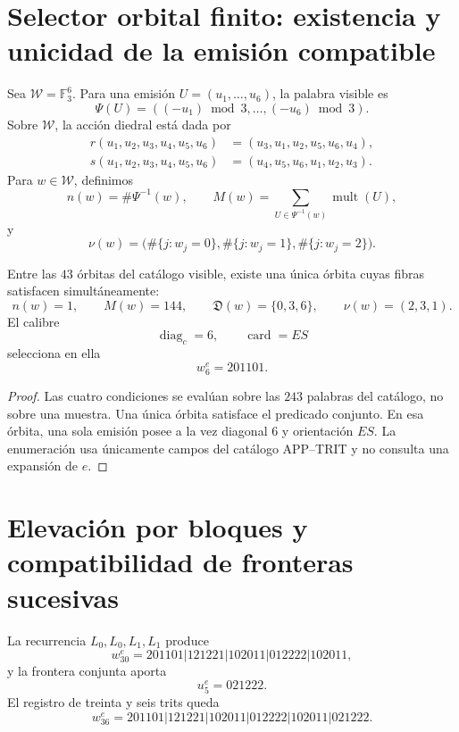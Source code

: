 
\label{gfp:b:chap:biografia-completa-e}

\section{Selector orbital finito: existencia y unicidad de la emisión compatible}

Sea \(\mathcal W=\mathbb F_3^6\). Para una emisión
\(U=(u_1,\ldots,u_6)\), la palabra visible es
\[
 \Psi(U)=((-u_1)\bmod3,\ldots,(-u_6)\bmod3).
\]
Sobre \(\mathcal W\), la acción diedral está dada por
\[
\begin{aligned}
 r(u_1,u_2,u_3,u_4,u_5,u_6)
 &=(u_3,u_1,u_2,u_5,u_6,u_4),\\
 s(u_1,u_2,u_3,u_4,u_5,u_6)
 &=(u_4,u_5,u_6,u_1,u_2,u_3).
\end{aligned}
\]
Para \(w\in\mathcal W\), definimos
\[
 n(w)=\#\Psi^{-1}(w),
 \qquad
 M(w)=\sum_{U\in\Psi^{-1}(w)}\operatorname{mult}(U),
\]
y
\[
 \nu(w)=
 \bigl(
 \#\{j:w_j=0\},
 \#\{j:w_j=1\},
 \#\{j:w_j=2\}
 \bigr).
\]

\begin{theorem}
\label{gfp:b:thm:seleccion-estructural-e}
Entre las \(43\) órbitas del catálogo visible, existe una única órbita cuyas
fibras satisfacen simultáneamente:
\[
 n(w)=1,\qquad M(w)=144,\qquad
 \mathfrak D(w)=\{0,3,6\},\qquad
 \nu(w)=(2,3,1).
\]
El calibre
\[
 \operatorname{diag}_c=6,
 \qquad \operatorname{card}=ES
\]
selecciona en ella
\[
 \boxed{w_6^e=201101.}
\]
\end{theorem}

\begin{proof}
Las cuatro condiciones se evalúan sobre las \(243\) palabras del catálogo,
no sobre una muestra. Una única órbita satisface el predicado conjunto. En
esa órbita, una sola emisión posee a la vez diagonal \(6\) y orientación
\(ES\). La enumeración usa únicamente campos del catálogo APP--TRIT y no
consulta una expansión de \(e\).
\end{proof}

\section{Elevación por bloques y compatibilidad de fronteras sucesivas}

La recurrencia \(L_0,L_0,L_1,L_1\) produce
\[
 w_{30}^{e}
 =201101|121221|102011|012222|102011,
\]
y la frontera conjunta aporta
\[
 u_5^e=021222.
\]
El registro de treinta y seis trits queda
\[
 w_{36}^{e}
 =201101|121221|102011|012222|102011|021222.
\]

